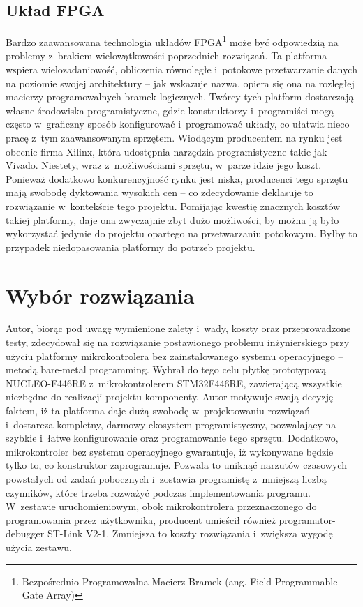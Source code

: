 \subsection{Układ FPGA}
\label{FPGA}
Bardzo zaawansowana technologia układów FPGA\footnote{Bezpośrednio Programowalna Macierz Bramek (ang. Field Programmable Gate Array)} może być odpowiedzią na problemy z~brakiem wielowątkowości poprzednich rozwiązań. Ta platforma wspiera wielozadaniowość, obliczenia równoległe i~potokowe przetwarzanie danych na poziomie swojej architektury -- jak wskazuje nazwa, opiera się ona na rozległej macierzy programowalnych bramek logicznych. Twórcy tych platform dostarczają własne środowiska programistyczne, gdzie konstruktorzy i~programiści mogą często w~graficzny sposób konfigurować i~programować układy, co ułatwia nieco pracę z~tym zaawansowanym sprzętem. Wiodącym producentem na rynku jest obecnie firma Xilinx, która udostępnia narzędzia programistyczne takie jak Vivado. Niestety, wraz z~możliwościami sprzętu, w~parze idzie jego koszt. Ponieważ dodatkowo konkurencyjność rynku jest niska, producenci tego sprzętu mają swobodę dyktowania wysokich cen -- co zdecydowanie deklasuje to rozwiązanie w~kontekście tego projektu. Pomijając kwestię znacznych kosztów takiej platformy, daje ona zwyczajnie zbyt dużo możliwości, by można ją było wykorzystać jedynie do projektu opartego na przetwarzaniu potokowym. Byłby to przypadek niedopasowania platformy do potrzeb projektu.
\section{Wybór rozwiązania}
\label{sec:wybór}
Autor, biorąc pod uwagę wymienione zalety i~wady, koszty oraz przeprowadzone testy, zdecydował się na rozwiązanie postawionego problemu inżynierskiego przy użyciu platformy mikrokontrolera bez zainstalowanego systemu operacyjnego -- metodą bare-metal programming. Wybrał do tego celu płytkę prototypową NUCLEO-F446RE z~mikrokontrolerem STM32F446RE, zawierającą wszystkie niezbędne do realizacji projektu komponenty. Autor motywuje swoją decyzję faktem, iż ta platforma daje dużą swobodę w~projektowaniu rozwiązań i~dostarcza kompletny, darmowy ekosystem programistyczny, pozwalający na szybkie i~łatwe konfigurowanie oraz programowanie tego sprzętu. Dodatkowo, mikrokontroler bez systemu operacyjnego gwarantuje, iż wykonywane będzie tylko to, co konstruktor zaprogramuje. Pozwala to uniknąć narzutów czasowych powstałych od zadań pobocznych i~zostawia programistę z~mniejszą liczbą czynników, które trzeba rozważyć podczas implementowania programu. W~zestawie uruchomieniowym, obok mikrokontrolera przeznaczonego do programowania przez użytkownika, producent umieścił również programator-debugger ST-Link V2-1. Zmniejsza to koszty rozwiązania i~zwiększa wygodę użycia zestawu.
